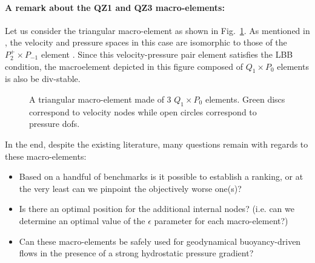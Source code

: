 \documentclass[a4paper,12pt]{article}
\begin{document}
\paragraph{A remark about the QZ1 and QZ3 macro-elements:}
Let us consider the triangular macro-element as shown in Fig.~\ref{fig:triangle}.
As mentioned in \cite{rovira1992}, 
the velocity and pressure spaces in this case are isomorphic to those
of the $P_2^+ \times P_{-1}$ element \cite{thba25}. Since this velocity-pressure pair 
element satisfies the LBB condition, the macroelement depicted in this figure
composed of $Q_1 \times P_0$ elements is also be div-stable.

\begin{figure}
\centering
{}
\caption{A triangular macro-element made of 3 $Q_1\times P_0$ elements.
Green discs correspond to velocity nodes while open circles 
correspond to pressure dofs.}\label{fig:triangle}
\end{figure}

\vspace{.4cm}


In the end, despite the existing literature, many questions remain with regards to these macro-elements:
\begin{itemize}
\item Based on a handful of benchmarks is it possible to establish a ranking, or at the very least can we pinpoint the objectively worse one(s)?

\item Is there an optimal position for the additional internal nodes? (i.e. can we determine an optimal value of the 
$\epsilon$ parameter for each macro-element?)

\item Can these macro-elements be safely used for geodynamical 
buoyancy-driven flows in the presence of a strong hydrostatic pressure gradient?
\end{itemize}
\end{document}
